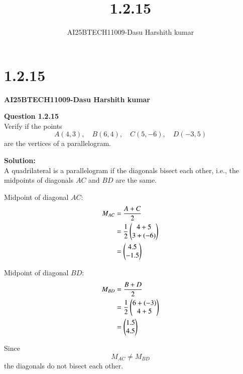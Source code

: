 \documentclass[journal]{IEEEtran}
\begin{document}

\vspace{3cm}

\title{1.2.15}
\author{AI25BTECH11009-Dasu Harshith kumar}
 \maketitle


{\let\newpage\relax\maketitle}

\renewcommand{\thefigure}{\theenumi}
\renewcommand{\thetable}{\theenumi}
\setlength{\intextsep}{10pt} 


\renewcommand{\thetable}{\theenumi}




\section*{1.2.15}
\textbf{AI25BTECH11009-Dasu Harshith kumar}

\textbf{Question 1.2.15} \\
Verify if the points 
\[
A(4,3),\quad B(6,4),\quad C(5,-6),\quad D(-3,5)
\]
are the vertices of a parallelogram.

\textbf{Solution:} \\
A quadrilateral is a parallelogram if the diagonals bisect each other, i.e., the midpoints of diagonals \( AC \) and \( BD \) are the same.

Midpoint of diagonal \( AC \):
\begin{align*}
M_{AC} &= \frac{A + C}{2} \\
       &= \frac{1}{2} \begin{pmatrix}4+5 \\ 3+(-6)\end{pmatrix} \\
       &= \begin{pmatrix}4.5 \\ -1.5\end{pmatrix}
\end{align*}

Midpoint of diagonal \( BD \):
\begin{align*}
M_{BD} &= \frac{B + D}{2} \\
       &= \frac{1}{2} \begin{pmatrix}6+(-3) \\ 4+5\end{pmatrix} \\
       &= \begin{pmatrix}1.5 \\ 4.5\end{pmatrix}
\end{align*}

Since\[
M_{AC} \ne M_{BD}
\]
the diagonals do not bisect each other.
\end{document}
